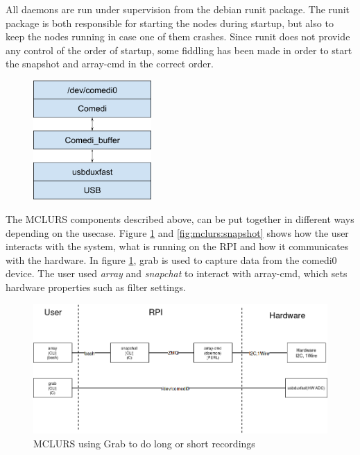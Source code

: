 All daemons are run under supervision from the debian runit package. The runit package is both responsible for starting the nodes during startup, but also to keep the nodes running in case one of them crashes. Since runit does not provide any control of the order of startup, some fiddling has been made in order to start the snapshot and array-cmd in the correct order. 


 \label{sec:existingsystem:software:kernelmodule}

\begin{figure}[h!]
	\centering
	\includegraphics[width=0.4\textwidth]{figures/mclurs_comedi}
\end{figure}

The MCLURS components described above, can be put together in different ways depending on the usecase. Figure \ref{fig:mclurs:grab} and \ref{fig:mclurs:snapshot} shows how the user interacts with the system, what is running on the RPI and how it communicates with the hardware. In figure \ref{fig:mclurs:grab}, grab is used to capture data from the comedi0 device. The user used \textit{array} and \textit{snapchat} to interact with array-cmd, which sets hardware properties such as filter settings.

\begin{figure}[h!]
	\centering
	\includegraphics[width=\textwidth]{figures/mclurs_app1}
	\caption{MCLURS using Grab to do long or short recordings} \label{fig:mclurs:grab}
\end{figure}

